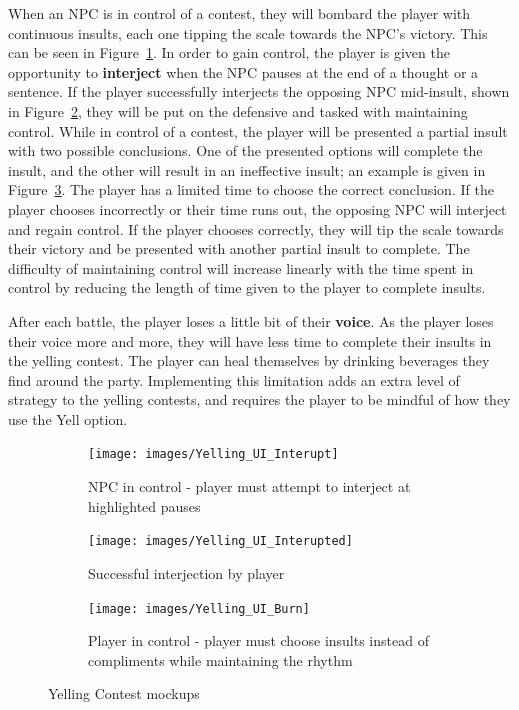 \documentclass{GlobalDocument}
\begin{document}
When an NPC is in control of a contest, they will bombard the player with continuous insults, each one tipping the scale towards the NPC's victory. This can be seen in Figure~\ref{fig:yelling_contest_offense}. In order to gain control, the player is given the opportunity to \textbf{interject} when the NPC pauses at the end of a thought or a sentence. If the player successfully interjects the opposing NPC mid-insult, shown in Figure~\ref{fig:yelling_contest_interject}, they will be put on the defensive and tasked with maintaining control. While in control of a contest, the player will be presented a partial insult with two possible conclusions. One of the presented options will complete the insult, and the other will result in an ineffective insult; an example is given in Figure~\ref{fig:yelling_contest_defense}. The player has a limited time to choose the correct conclusion. If the player chooses incorrectly or their time runs out, the opposing NPC will interject and regain control. If the player chooses correctly, they will tip the scale towards their victory and be presented with another partial insult to complete. The difficulty of maintaining control will increase linearly with the time spent in control by reducing the length of time given to the player to complete insults. 

After each battle, the player loses a little bit of their \textbf{voice}. As the player loses their voice more and more, they will have less time to complete their insults in the yelling contest. The player can heal themselves by drinking beverages they find around the party. Implementing this limitation adds an extra level of strategy to the yelling contests, and requires the player to be mindful of how they use the Yell option.

\begin{figure}[htb]

\begin{subfigure}{.33\textwidth}
\centering
\texttt{[image: images/Yelling\_UI\_Interupt]}
\caption{NPC in control - player must attempt to interject at highlighted pauses}
\label{fig:yelling_contest_offense}
\end{subfigure}%
\begin{subfigure}{.33\textwidth}
\centering
\texttt{[image: images/Yelling\_UI\_Interupted]}
\caption{Successful interjection by player}
\label{fig:yelling_contest_interject}
\end{subfigure}%
\begin{subfigure}{.33\textwidth}
\centering
\texttt{[image: images/Yelling\_UI\_Burn]}
\caption{Player in control - player must choose insults instead of compliments while maintaining the rhythm}
\label{fig:yelling_contest_defense}

\end{subfigure}%
\caption{Yelling Contest mockups}
\label{fig:yelling_contest}
\end{figure}
\end{document}
